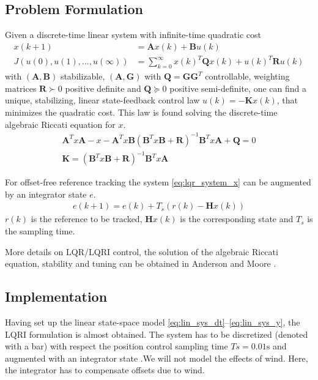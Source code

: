 \subsection{Problem Formulation}
Given a discrete-time linear system with infinite-time quadratic cost
\begin{align}
x(k+1) &= \mathbf{A}x(k) + \mathbf{B}u(k) \label{eq:lqr_system_x}\\
J(u(0),u(1),...,u(\infty)) &= \sum_{k=0}^\infty  x(k)^T\mathbf{Q}x(k) + u(k)^T\mathbf{R}u(k) \label{eq:lqr_system_J}
\end{align} 
with $(\mathbf{A},\mathbf{B})$ stabilizable, $(\mathbf{A},\mathbf{G})$ with $\mathbf{Q}= \mathbf{G} \mathbf{G}^T$ controllable, weighting matrices $\mathbf{R}\succ0$ positive definite and $\mathbf{Q}\succeq0$ positive semi-definite, one can find a unique, stabilizing, linear state-feedback control law $u(k) = -\mathbf{K} x(k)$, that minimizes the quadratic cost.
This law is found solving the discrete-time algebraic Riccati equation for $x$.
\begin{align}
\mathbf{A}^Tx\mathbf{A} - x - \mathbf{A}^T x \mathbf{B} \left( \mathbf{B}^T x \mathbf{B} + \mathbf{R} \right)^{-1} \mathbf{B}^T x \mathbf{A} + \mathbf{Q} = 0 \\
\mathbf{K} = \left( \mathbf{B}^T x \mathbf{B} + \mathbf{R} \right)^{-1} \mathbf{B}^T x \mathbf{A}
\end{align}

For offset-free reference tracking the system \ref{eq:lqr_system_x} can be augmented by an integrator state $e$.
\begin{align}
e(k+1) = e(k) + {T_s} \left( r(k) - \mathbf{H}x(k) \right) \label{eq:lqr_system_e}
\end{align}
$r(k)$ is the reference to be tracked, $\mathbf{H}x(k)$ is the corresponding state and $T_s$ is the sampling time.

More details on LQR/LQRI control, the solution of the algebraic Riccati equation, stability and tuning can be obtained in Anderson and Moore \cite{Anderson2007}.

\subsection{Implementation}
Having set up the linear state-space model \ref{eq:lin_sys_dt}--\ref{eq:lin_sys_y}, the LQRI formulation is almost obtained. The system has to be discretized (denoted with a bar) with respect the position control sampling time $Ts=0.01\si{\second}$ and augmented with an integrator state .We will not model the effects of wind. Here, the integrator has to compensate offsets due to wind. 

